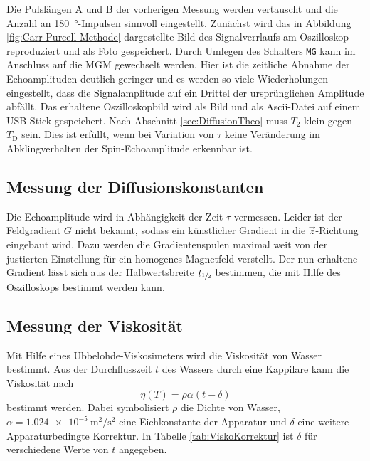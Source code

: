 Die Pulslängen A und B der vorherigen Messung werden vertauscht und die Anzahl an
\SI{180}{\degree}-Impulsen sinnvoll eingestellt.
Zunächst wird das in Abbildung \ref{fig:Carr-Purcell-Methode} dargestellte
Bild des Signalverrlaufs am Oszilloskop reproduziert und als Foto gespeichert.
Durch Umlegen des Schalters \texttt{MG} kann im Anschluss auf die MGM gewechselt werden.
Hier ist die zeitliche Abnahme der Echoamplituden deutlich geringer und es
werden so viele Wiederholungen eingestellt, dass die Signalamplitude auf ein Drittel
der ursprünglichen Amplitude abfällt.
Das erhaltene Oszilloskopbild wird als Bild und als Ascii-Datei auf einem USB-Stick
gespeichert.
Nach Abschnitt \ref{sec:DiffusionTheo} muss $T_2$ klein gegen $T_\text{D}$ sein.
Dies ist erfüllt, wenn bei Variation von $\tau$ keine Veränderung im Abklingverhalten
der Spin-Echoamplitude erkennbar ist.


\subsection{Messung der Diffusionskonstanten}
\label{sec:DurchDiffusion}

Die Echoamplitude wird in Abhängigkeit der Zeit $\tau$ vermessen.
Leider ist der Feldgradient $G$ nicht bekannt, sodass ein künstlicher Gradient
in die $\vec{z}$-Richtung eingebaut wird. Dazu werden die Gradientenspulen maximal
weit von der justierten Einstellung für ein homogenes Magnetfeld verstellt.
Der nun erhaltene Gradient lässt sich aus der Halbwertsbreite $t_{\sfrac{1}{2}}$
bestimmen, die mit Hilfe des Oszilloskops bestimmt werden kann.


\subsection{Messung der Viskosität}
\label{sec:DurchVisko}

Mit Hilfe eines Ubbelohde-Viskosimeters wird die Viskosität von Wasser bestimmt.
Aus der Durchflusszeit $t$ des Wassers durch eine Kappilare kann die
Viskosität nach
\begin{equation}
  \eta\!\left(T\right) = \rho \alpha \left(t - \delta\right)
  \label{eqn:Viskositaet}
\end{equation}
bestimmt werden.
Dabei symbolisiert $\rho$ die Dichte von Wasser,
$\alpha = \SI{1.024e-5}{\meter\squared\per\second\squared}$ eine Eichkonstante
der Apparatur und $\delta$ eine weitere Apparaturbedingte Korrektur.
In Tabelle \ref{tab:ViskoKorrektur} ist $\delta$ für verschiedene Werte
von $t$ angegeben.


